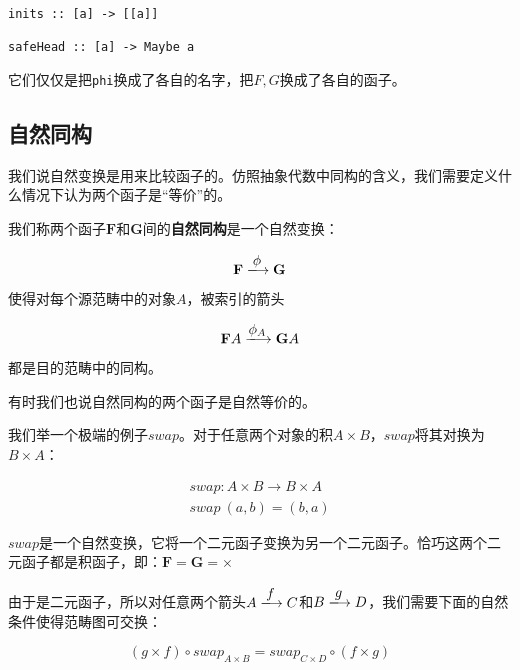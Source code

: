 \documentclass{article}
\begin{document}
\begin{lstlisting}
inits :: [a] -> [[a]]

safeHead :: [a] -> Maybe a
\end{lstlisting}

它们仅仅是把\texttt{phi}换成了各自的名字，把$F, G$换成了各自的函子。

\subsection{自然同构}

我们说自然变换是用来比较函子的。仿照抽象代数中同构的含义，我们需要定义什么情况下认为两个函子是“等价”的。

\begin{definition}
我们称两个函子$\mathbf{F}$和$\mathbf{G}$间的\textbf{自然同构}是一个自然变换：

\[
  \mathbf{F} \arrowto{\phi} \mathbf{G}
\]

使得对每个源范畴中的对象$A$，被索引的箭头

\[
  \mathbf{F}A \arrowto{\phi_A} \mathbf{G}A
\]

都是目的范畴中的同构。
\end{definition}

有时我们也说自然同构的两个函子是自然等价的。 %

我们举一个极端的例子$swap$。对于任意两个对象的积$A \times B$，$swap$将其对换为$B \times A$：

\[
\begin{array}{l}
swap : A \times B \to B \times A \\
swap\ (a, b) = (b, a)
\end{array}
\]

$swap$是一个自然变换，它将一个二元函子变换为另一个二元函子。恰巧这两个二元函子都是积函子，即：$\mathbf{F} = \mathbf{G} = \times$

由于是二元函子，所以对任意两个箭头$A \arrowto{f} C$和$B \arrowto{g} D$，我们需要下面的自然条件使得范畴图可交换：


\[
(g \times f) \circ swap_{A \times B} = swap_{C \times D} \circ (f \times g)
\]

\begin{center}
\end{center}
\end{document}

